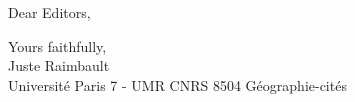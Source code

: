 \documentclass[11pt,a4paper,sans]{moderncv}        %
\begin{document}





\date{December 26, 2016}
\opening{Dear Editors,}
\closing{Yours faithfully,\\
Juste Raimbault\\
Université Paris 7 - UMR CNRS 8504 Géographie-cités
}
\makelettertitle

\justify


\justify




\makeletterclosing
\end{document}
